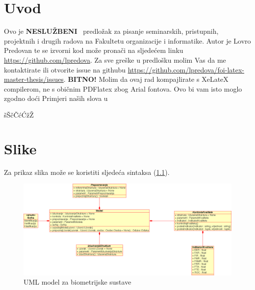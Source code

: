 \documentclass[a4paper,12pt]{foi}
\begin{document}

\maketitle
\tableofcontents
\thispagestyle{empty}
\setcounter{page}{0}

\chapter{Uvod}

Ovo je \textbf{NESLU\v{Z}BENI} \LaTeXe\ predlo\v{z}ak za pisanje seminarskih, pristupnih, projektnih i drugih radova na Fakultetu organizacije i informatike. Autor je Lovro Predovan te se izvorni kod mo\v{z}e prona\v{c}i na sljede\'cem linku \url{https://github.com/lpredova}. Za sve gre\v{s}ke u predlo\v{s}ku molim Vas da me kontaktirate ili otvorite issue na githubu \url{https://github.com/lpredova/foi-latex-master-thesis/issues}.
\newline
\textbf{BITNO!}
\newline
Molim da ovaj rad kompajlirate s XeLateX compilerom, ne s obi\v{c}nim PDFlatex zbog Arial fontova.
\newline
Ovo bi vam isto moglo zgodno doći
Primjeri na\v{s}ih slova u \LaTeXe\

\v{s}\v{S}\DJ\dj\v{c}\v{C}\'c\'C\v{z}\v{Z}

\chapter*{Slike}

Za prikaz slika mo\v{z}e se koristiti sljede\'{c}a sintaksa (\ref{slika-1}).

\begin{figure}[h]
\centering 
\includegraphics[width=\textwidth]{model}

\caption{UML model za biometrijske sustave \cite{Schatten2008}}
\label{slika-1}
\end{figure}
\end{document}
